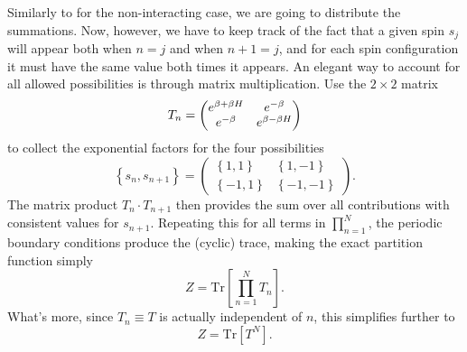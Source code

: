 Similarly to  for the non-interacting case, we are going to distribute the summations.
Now, however, we have to keep track of the fact that a given spin $s_j$ will appear both when $n = j$ and when $n + 1 = j$, and for each spin configuration it must have the same value both times it appears.
An elegant way to account for all allowed possibilities is through matrix multiplication.
Use the $2\times 2$ matrix
\begin{equation}
  T_n = \begin{pmatrix} e^{\beta + \beta H} & e^{-\beta} \\ e^{-\beta} & e^{\beta - \beta H} \end{pmatrix}
\end{equation}
to collect the exponential factors for the four possibilities
\begin{equation*}
  \left\{s_n, s_{n + 1}\right\} = \begin{pmatrix} \left\{1, 1\right\} & \left\{1, -1\right\} \\ \left\{-1, 1\right\} & \left\{-1, -1\right\} \end{pmatrix}.
\end{equation*}
The matrix product $T_n \cdot T_{n + 1}$ then provides the sum over all contributions with consistent values for $s_{n + 1}$.
Repeating this for all terms in $\prod_{n = 1}^N$, the periodic boundary conditions produce the (cyclic) trace, making the exact partition function simply
\begin{equation*}
  Z = \mbox{Tr}\left[\prod_{n = 1}^N T_n \right].
\end{equation*}
What's more, since $T_n \equiv T$ is actually independent of $n$, this simplifies further to
\begin{equation}
  Z = \mbox{Tr}\left[T^N \right].
\end{equation}

